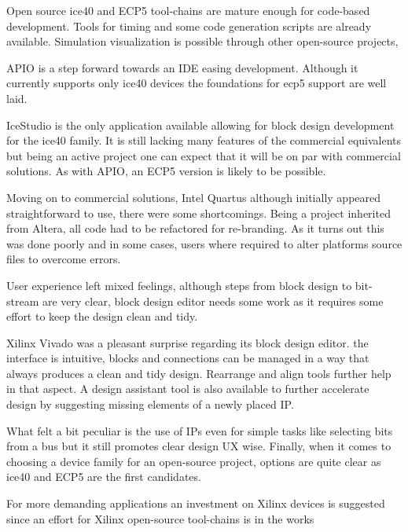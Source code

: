 Open source ice40 and ECP5 tool-chains are mature enough for code-based development. Tools for timing and some code generation scripts are already available. Simulation visualization is possible through other open-source projects, 

APIO is a step forward towards an IDE easing development. Although it currently supports only ice40 devices the foundations for ecp5 support are well laid.

IceStudio is the only application available allowing for block design development for the ice40 family. It is still lacking many features of the commercial equivalents but being an active project one can expect that it will be on par with commercial solutions. As with APIO, an ECP5 version is likely to be possible.

Moving on to commercial solutions, Intel Quartus although initially appeared straightforward to use, there were some shortcomings. Being a project inherited from Altera, all code had to be refactored for re-branding. As it turns out this was done poorly and in some cases, users where required to alter platforms source files to overcome errors. 

User experience left mixed feelings, although steps from block design to bit-stream are very clear, block design editor needs some work as it requires some effort to keep the design clean and tidy.

Xilinx Vivado was a pleasant surprise regarding its block design editor. the interface is intuitive, blocks and connections can be managed in a way that always produces a clean and tidy design. Rearrange and align tools further help in that aspect. 
A design assistant tool is also available to further accelerate design by suggesting missing elements of a newly placed IP.

What felt a bit peculiar is the use of IPs even for simple tasks like selecting bits from a bus but it still promotes clear design UX wise.
Finally, when it comes to choosing a device family for an open-source project, options are quite clear as ice40 and ECP5 are the first candidates.

For more demanding applications an investment on Xilinx devices is suggested since an effort for Xilinx open-source tool-chains is in the works